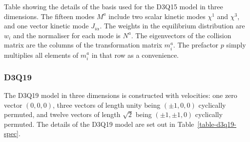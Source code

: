 \begin{table}[t]
\caption{Table showing the details of the basis used for the D3Q15 model
in three dimensions. The fifteen modes $M^a$ include two scalar kinetic
modes $\chi^1$ and $\chi^3$, and one vector kinetic mode $J_{i\alpha}$.
The weights in the equilibrium distribution are $w_i$ and the normaliser
for each mode is $N^a$. The eigenvectors of the collision matrix are the
columns of the transformation matrix $m_i^a$. The prefactor $p$ simply
multiplies all elements of $m_i^a$ in that row as a convenience.
\label{table-d3q15-spec}
}
\end{table}


\subsubsection{D3Q19}

The D3Q19 model in three dimensions is constructed with velocities:
one zero vector $(0,0,0)$, three vectors of length unity being
$(\pm 1, 0, 0)$ cyclically permuted, and twelve vectors of length
$\sqrt{2}$ being $(\pm 1, \pm 1, 0)$ cyclically permuted. The
details of the D3Q19 model are set out in Table~\ref{table-d3q19-spec}.

